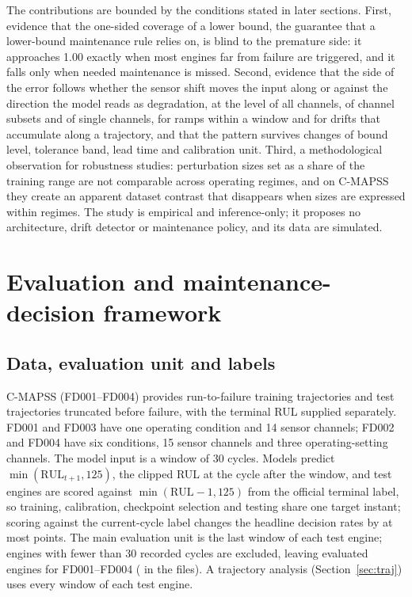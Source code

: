 The contributions are bounded by the conditions stated in later sections. First, evidence that the one-sided coverage of a lower bound, the guarantee that a lower-bound maintenance rule relies on, is blind to the premature side: it approaches 1.00 exactly when most engines far from failure are triggered, and it falls only when needed maintenance is missed. Second, evidence that the side of the error follows whether the sensor shift moves the input along or against the direction the model reads as degradation, at the level of all channels, of channel subsets and of single channels, for ramps within a window and for drifts that accumulate along a trajectory, and that the pattern survives changes of bound level, tolerance band, lead time and calibration unit. Third, a methodological observation for robustness studies: perturbation sizes set as a share of the training range are not comparable across operating regimes, and on C-MAPSS they create an apparent dataset contrast that disappears when sizes are expressed within regimes. The study is empirical and inference-only; it proposes no architecture, drift detector or maintenance policy, and its data are simulated.

\section{Evaluation and maintenance-decision framework}\label{sec:framework}
\subsection{Data, evaluation unit and labels}
C-MAPSS (FD001--FD004)\cite{saxena2008} provides run-to-failure training trajectories and test trajectories truncated before failure, with the terminal RUL supplied separately. FD001 and FD003 have one operating condition and 14 sensor channels; FD002 and FD004 have six conditions, 15 sensor channels and three operating-setting channels. The model input is a window of 30 cycles. Models predict $\min(\mathrm{RUL}_{t+1},125)$, the clipped RUL at the cycle after the window, and test engines are scored against $\min(\mathrm{RUL}-1,125)$ from the official terminal label, so training, calibration, checkpoint selection and testing share one target instant; scoring against the current-cycle label changes the headline decision rates by at most \JLabelHeadline{} points. The main evaluation unit is the last window of each test engine; engines with fewer than 30 recorded cycles are excluded, leaving \JEvalEng{} evaluated engines for FD001--FD004 (\JFileEng{} in the files). A trajectory analysis (Section~\ref{sec:traj}) uses every window of each test engine.

